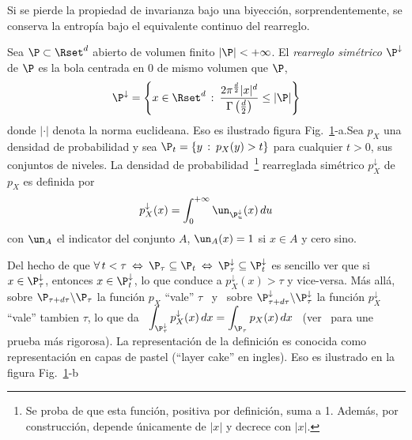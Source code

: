 Si se pierde la propiedad de invarianza bajo una biyecci\'on, sorprendentemente,
se conserva la entrop\'ia bajo el equivalente continuo del rearreglo.
%
\begin{definicion}\label{def:SZ:rearreglo}
  Sea $\P \subset \Rset^d$ abierto de  volumen finito $|\P| < +\infty$.  El {\it
    rearreglo sim\'etrico} $\P^\downarrow$  de $\P$ es la bola  centrada en 0 de
  mismo volumen que $\P$, \ie
  \[
  \P^\downarrow  = \left\{  x  \in  \Rset^d \,  :  \: \frac{2  \pi^{\frac{d}{2}}
      |x|^d}{\Gamma\left(\frac{d}{2}\right)} \le |\P| \right\}
  \]
  donde  $|\cdot|$  denota  la   norma  euclideana.   Eso  es  ilustrado  figura
  Fig.~\ref{fig:SZ:ensemblerearreglado}-a.\newline  Sea  $p_X$  una densidad  de
  probabilidad y sea $\P_t = \{ y \, : \: p_X(y) > t \}$ para cualquier $t > 0$,
  sus conjuntos  de niveles.  La densidad de  probabilidad~\footnote{Se proba de
    que  esta funci\'on,  positiva por  definici\'on, suma  a 1.   Adem\'as, por
    construcci\'on,  depende  \'unicamente  de   $|x|$  y  decrece  con  $|x|$.}
  rearreglada sim\'etrico $p^\downarrow_X$ de $p_X$ es definida por
  \[
  p^\downarrow_X(x)  =  \int_0^{+\infty}  \un_{\P_u^\downarrow}(x) \,  du
  \]
  con $\un_A$ el indicator  del conjunto $A$, \ie $\un_A(x) = 1$  si $x \in A$ y
  cero sino.
\end{definicion}
%
Del hecho  de que $\forall \, t  < \tau \: \Leftrightarrow  \: \P_\tau \subseteq
\P_t  \:  \Leftrightarrow \:  \P_\tau^\downarrow  \subseteq \P_t^\downarrow$  es
sencillo   ver   que   si   $x   \in  \P_\tau^\downarrow$,   entonces   $x   \in
\P_t^\downarrow$,  lo que  conduce a  $p_X^\downarrow(x) >  \tau$  y vice-versa.
M\'as  all\'a, sobre  $\P_{\tau+d\tau}  \backslash \P_\tau$  la funci\'on  $p_X$
``vale''   $\tau$   \   y   \   sobre   $\P_{\tau+d\tau}^\downarrow   \backslash
\P_\tau^\downarrow$  la funci\'on $p_X^\downarrow$  ``vale'' tambien  $\tau$, lo
que  da \  $\displaystyle  \int_{\P_\tau^\downarrow} p_X^\downarrow(x)  \, dx  =
\int_{\P_\tau} p_X(x)  \, dx$ \  (ver~\cite{LieLos01, WanMad04} para  une prueba
m\'as  rigorosa).   La representaci\'on  de  la  definici\'on  es conocida  como
representaci\'on  en  capas  de  pastel  (``layer cake''  en  ingles).   Eso  es
ilustrado en la figura Fig.~\ref{fig:SZ:ensemblerearreglado}-b
  \begin{figure}[h!]
  \begin{center}  \end{center}
  \label{fig:SZ:ensemblerearreglado}
  \end{figure}

